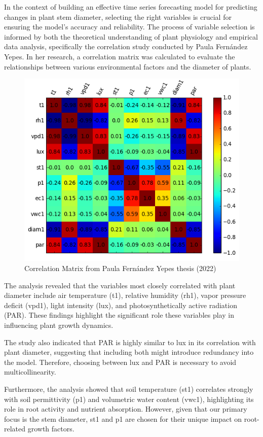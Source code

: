 In the context of building an effective time series forecasting model for predicting changes in plant stem diameter, selecting the right variables is crucial for ensuring the model's accuracy and reliability. The process of variable selection is informed by both the theoretical understanding of plant physiology and empirical data analysis, specifically the correlation study conducted by Paula Fernández Yepes. In her research, a correlation matrix was calculated to evaluate the relationships between various environmental factors and the diameter of plants.

\begin{figure}[htbp]
    \centering
    \includegraphics[width=10 cm]{4_ChapterMaterials/figuras/Correlation_matrix.png}
    \caption{Correlation Matrix from Paula Fernández Yepes thesis (2022)\cite{FernandezYepes2022}}
    \end{figure}

The analysis revealed that the variables most closely correlated with plant diameter include air temperature (t1), relative humidity (rh1), vapor pressure deficit (vpd1), light intensity (lux), and photosynthetically active radiation (PAR). These findings highlight the significant role these variables play in influencing plant growth dynamics.

The study also indicated that PAR is highly similar to lux in its correlation with plant diameter, suggesting that including both might introduce redundancy into the model. Therefore, choosing between lux and PAR is necessary to avoid multicollinearity.

Furthermore, the analysis showed that soil temperature (st1) correlates strongly with soil permittivity (p1) and volumetric water content (vwc1), highlighting its role in root activity and nutrient absorption. However, given that our primary focus is the stem diameter, st1 and p1 are chosen for their unique impact on root-related growth factors. 

